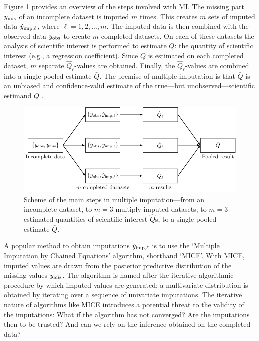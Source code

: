 \documentclass[Royal,times,sageh]{sagej}
\begin{document}
Figure \ref{fig:diagram} provides an overview of the steps involved with MI. The missing part \(y_{\rm mis}\) of an incomplete dataset is imputed \(m\) times. This creates \(m\) sets of imputed data \(\dot y_{\rm imp, \ell}\), where \(\ell = 1, 2, ..., m\). The imputed data is then combined with the observed data \(y_{\rm obs}\) to create \(m\) completed datasets. On each of these datasets the analysis of scientific interest is performed to estimate \(Q\): the quantity of scientific interest (e.g., a regression coefficient). Since \(Q\) is estimated on each completed dataset, \(m\) separate \(\hat{Q}_\ell\)-values are obtained. Finally, the \(\hat{Q}_\ell\)-values are combined into a single pooled estimate \(\bar{Q}\). The premise of multiple imputation is that \(\bar{Q}\) is an unbiased and confidence-valid estimate of the true---but unobserved---scientific estimand \(Q\) \citep{rubin96}.

\begin{figure}

{\centering \includegraphics[width=\linewidth]{../Figures/DiagramMI} 

}

\caption{Scheme of the main steps in multiple imputation---from an incomplete dataset, to $m=3$ multiply imputed datasets, to $m=3$ estimated quantities of scientific interest $\hat{Q}$s, to a single pooled estimate $\bar{Q}$.}\label{fig:diagram}
\end{figure}

A popular method to obtain imputations \(\dot y_{\rm imp, \ell}\) is to use the `Multiple Imputation by Chained Equations' algorithm, shorthand `MICE'\citep{mice}. With MICE, imputed values are drawn from the posterior predictive distribution of the missing values \(y_{\rm mis}\). The algorithm is named after the iterative algorithmic procedure by which imputed values are generated: a multivariate distribution is obtained by iterating over a sequence of univariate imputations. The iterative nature of algorithms like MICE introduces a potential threat to the validity of the imputations: What if the algorithm has not converged? Are the imputations then to be trusted? And can we rely on the inference obtained on the completed data?
\end{document}
